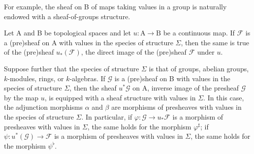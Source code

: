 For example, the sheaf on B of maps taking values in a group is naturally endowed with a sheaf-of-groups structure.

Let A and B be topological spaces and let \(u\colon\mathrm{A}\to\mathrm{B}\) be a continuous map. If \(\mathcal{F}\) is a (pre)sheaf on A with values in the species of structure \(\Sigma\), then the same is true of the (pre)sheaf \(u_{*}(\mathcal{F})\), the direct image of the (pre)sheaf \(\mathcal{F}\) under \(u\).

Suppose further that the species of structure \(\Sigma\) is that of groups, abelian groups, \(k\)-modules, rings, or \(k\)-algebras. If \(\mathcal{G}\) is a (pre)sheaf on B with values in the species of structure \(\Sigma\), then the sheaf \(u^{*}\mathcal{G}\) on A, inverse image of the presheaf \(\mathcal{G}\) by the map \(u\), is equipped with a sheaf structure with values in \(\Sigma\). In this case, the adjunction morphisms \(\alpha\) and \(\beta\) are morphisms of presheaves with values in the species of structure \(\Sigma\). In particular, if \(\varphi: \mathcal{G} \to u_{*}\mathcal{F}\) is a morphism of presheaves with values in \(\Sigma\), the same holds for the morphism \(\varphi^{\sharp}\); if \(\psi: u^{*}(\mathcal{G}) \to \mathcal{F}\) is a morphism of presheaves with values in \(\Sigma\), the same holds for the morphism \(\psi^{\flat}\).

